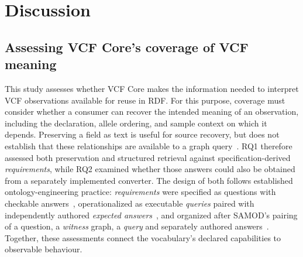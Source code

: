 
\section{Discussion}
\label{sec:discussion}








\subsection{Assessing VCF Core's coverage of VCF meaning}
\label{sec:summary}

This study assesses whether VCF Core makes the information needed to interpret VCF observations available for reuse in RDF.
For this purpose, coverage must consider whether a consumer can recover the intended meaning of an observation, including the declaration, allele ordering, and sample context on which it depends.
Preserving a field as text is useful for source recovery, but does not establish that these relationships are available to a graph query~\cite{gomezperez2001evaluation,sabou2012ontologyevaluation}.
RQ1 therefore assessed both preservation and structured retrieval against specification-derived \emph{requirements}, while RQ2 examined whether those answers could also be obtained from a separately implemented converter.
The design of both follows established ontology-engineering practice: \emph{requirements} were specified as questions with checkable answers~\cite{gruninger1995methodology,suarezfigueroa2009orsd,lot2022}, operationalized as executable \emph{queries} paired with independently authored \emph{expected answers}~\cite{blomqvist2012ontologytesting,wisniewski2019competencyquestions}, and organized after SAMOD's pairing of a question, a \emph{witness} graph, a \emph{query} and separately authored answers~\cite{samod2016}.
Together, these assessments connect the vocabulary's declared capabilities to observable behaviour.

